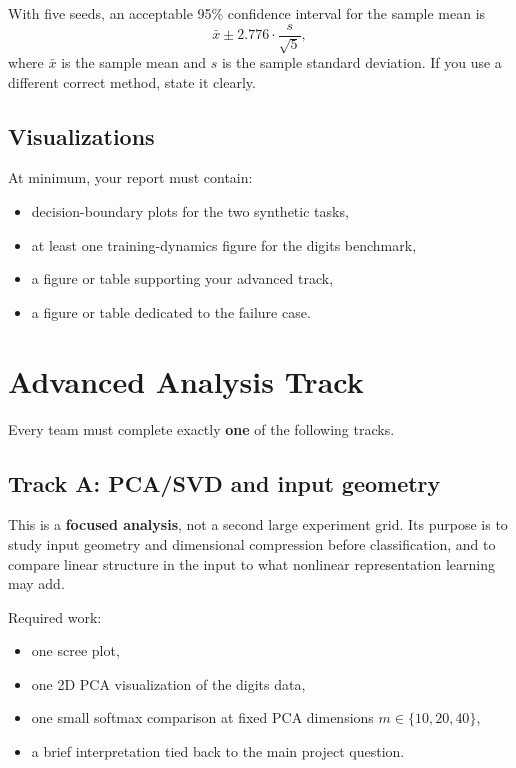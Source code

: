 \documentclass[11pt]{article}
\begin{document}
With five seeds, an acceptable 95\% confidence interval for the sample mean is
\[
\bar{x} \pm 2.776 \cdot \frac{s}{\sqrt{5}},
\]
where $\bar{x}$ is the sample mean and $s$ is the sample standard deviation. If you use a different correct method, state it clearly.

\subsection{Visualizations}

At minimum, your report must contain:

\begin{itemize}
    \item decision-boundary plots for the two synthetic tasks,
    \item at least one training-dynamics figure for the digits benchmark,
    \item a figure or table supporting your advanced track,
    \item a figure or table dedicated to the failure case.
\end{itemize}

\section{Advanced Analysis Track}

Every team must complete exactly \textbf{one} of the following tracks.

\subsection{Track A: PCA/SVD and input geometry}

This is a \textbf{focused analysis}, not a second large experiment grid. Its purpose is to study input geometry and dimensional compression before classification, and to compare linear structure in the input to what nonlinear representation learning may add.

Required work:

\begin{itemize}
    \item one scree plot,
    \item one 2D PCA visualization of the digits data,
    \item one small softmax comparison at fixed PCA dimensions \(m \in \{10,20,40\}\),
    \item a brief interpretation tied back to the main project question.
\end{itemize}
\end{document}
